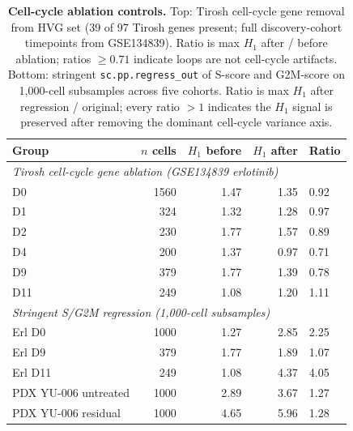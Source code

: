 \begin{table}
  \caption{\textbf{Cell-cycle ablation controls.}
  Top: Tirosh cell-cycle gene removal from HVG set (39 of 97 Tirosh
  genes present; full discovery-cohort timepoints from GSE134839).
  Ratio is max $H_1$ after / before ablation; ratios $\geq 0.71$
  indicate loops are not cell-cycle artifacts.
  Bottom: stringent \texttt{sc.pp.regress\_out} of S-score and
  G2M-score on 1{,}000-cell subsamples across five cohorts. Ratio is
  max $H_1$ after regression / original; every ratio $> 1$ indicates
  the $H_1$ signal is preserved after removing the dominant
  cell-cycle variance axis.}
  \label{tab:cc_controls}
  \centering
  \begin{tabular}{l r r r l}
    \toprule
    Group & $n$ cells & $H_1$ before & $H_1$ after & Ratio \\
    \midrule
    \multicolumn{5}{l}{\emph{Tirosh cell-cycle gene ablation (GSE134839 erlotinib)}} \\
    \midrule
    D0  & 1560 & 1.47 & 1.35 & 0.92 \\
    D1  &  324 & 1.32 & 1.28 & 0.97 \\
    D2  &  230 & 1.77 & 1.57 & 0.89 \\
    D4  &  200 & 1.37 & 0.97 & 0.71 \\
    D9  &  379 & 1.77 & 1.39 & 0.78 \\
    D11 &  249 & 1.08 & 1.20 & 1.11 \\
    \midrule
    \multicolumn{5}{l}{\emph{Stringent S/G2M regression (1{,}000-cell subsamples)}} \\
    \midrule
    Erl D0               & 1000 & 1.27 & 2.85 & 2.25 \\
    Erl D9               &  379 & 1.77 & 1.89 & 1.07 \\
    Erl D11              &  249 & 1.08 & 4.37 & 4.05 \\
    PDX YU-006 untreated & 1000 & 2.89 & 3.67 & 1.27 \\
    PDX YU-006 residual  & 1000 & 4.65 & 5.96 & 1.28 \\
    \bottomrule
  \end{tabular}
\end{table}
